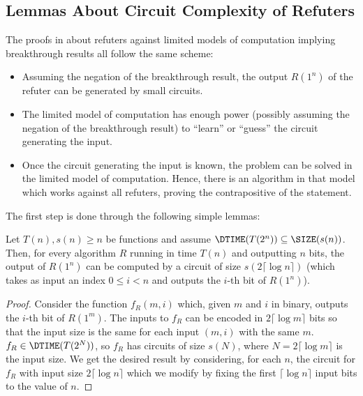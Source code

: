 \subsection{Lemmas About Circuit Complexity of Refuters}


The proofs in \cite{ConstructiveSeparations} about refuters against limited models of computation 
implying breakthrough results all follow the same scheme:

\begin{itemize}
	\item Assuming the negation of the breakthrough result, the output $R(1^n)$ of the refuter
	can be generated by small circuits.
	\item The limited model of computation has enough power (possibly assuming the negation
	of the breakthrough result) to ``learn'' or ``guess'' the circuit generating the input. 
	\item Once the circuit generating the input is known, the problem can be solved in 
	the limited model of computation. Hence, there is an algorithm in that model which works 
	against all refuters, proving the contrapositive of the statement. 
\end{itemize}

The first step is done through the following simple lemmas:


\begin{lemma}
	\label{lem:circuitbinarytounary}
	Let $T(n), s(n) \geq n$ be functions and assume $\DTIME(T(2^n)) \subseteq \SIZE(s(n))$. 
	Then, for every algorithm $R$ running in time $T(n)$ and outputting $n$ bits,
	the output of $R(1^n)$ can be computed by a circuit of size $s(2 \lceil \log n \rceil)$ 
	(which takes as input an index $0 \leq i < n$ and outputs the $i$-th bit of $R(1^n)$).
\end{lemma}
\begin{proof}
Consider the function $f_R(m, i)$ which, given $m$ and $i$ in binary, outputs the $i$-th bit of $R(1^m)$. The inputs to $f_R$ can 
be encoded in $2 \lceil \log m \rceil$ bits so that the input size is the same for each input $(m, i)$ with the same $m$.
$f_R \in \DTIME(T(2^N))$, so $f_R$ has circuits of size $s(N)$, where $N = 2 \lceil \log m \rceil$ is the input size. 
We get the desired result by considering, for each $n$, the circuit for $f_R$ with input size $2 \lceil \log n \rceil$
which we modify by fixing the first $\lceil \log n \rceil$ input 
bits to the value of $n$. 
\end{proof}

